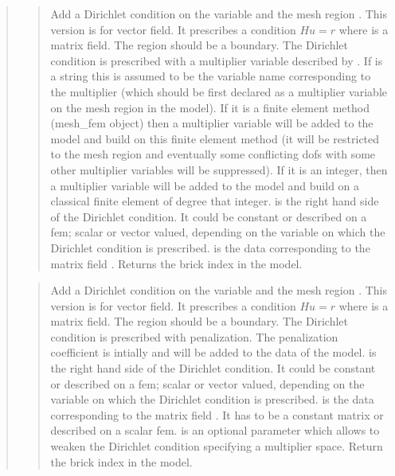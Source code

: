 \documentclass[a4paper,11pt,english]{sphinxmanual}
\begin{document}
\begin{quote}
\begin{quote}

Add a Dirichlet condition on the variable  and the mesh
region .  This version is for vector field.
It prescribes a condition \(Hu = r\)
where  is a matrix field. The region should be a boundary. The Dirichlet
condition is prescribed with a multiplier variable described by
. If  is a string this is assumed
to be the variable name corresponding to the multiplier (which should be
first declared as a multiplier variable on the mesh region in the model).
If it is a finite element method (mesh\_fem object) then a multiplier
variable will be added to the model and build on this finite element
method (it will be restricted to the mesh region  and eventually
some conflicting dofs with some other multiplier variables will be
suppressed). If it is an integer, then a  multiplier variable will be
added to the model and build on a classical finite element of degree
that integer.  is the right hand side of  the
Dirichlet condition. It could be constant or described on a fem; scalar
or vector valued, depending on the variable on which the Dirichlet
condition is prescribed.  is the data
corresponding to the matrix field .
Returns the brick index in the model.
\end{quote}

\begin{quote}

Add a Dirichlet condition on the variable  and the mesh
region . This version is for vector field.
It prescribes a condition \(Hu = r\)
where  is a matrix field.
The region should be a boundary. The Dirichlet
condition is prescribed with penalization. The penalization coefficient
is intially  and will be added to the data of the model.
 is the right hand side of the Dirichlet condition.
It could be constant or described on a fem; scalar or vector valued,
depending on the variable on which the Dirichlet condition is prescribed.
 is the data
corresponding to the matrix field . It has to be a constant matrix
or described on a scalar fem.
 is an optional parameter which allows to weaken the
Dirichlet condition specifying a multiplier space.
Return the brick index in the model.
\end{quote}


\end{quote}
\end{document}
